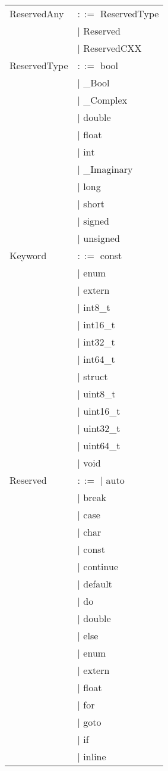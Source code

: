 \documentclass[a4paper]{article}
\begin{document}
\begin{tabular}{ll}
ReservedAny & $::=$ ReservedType\\
	&$\mid$ Reserved\\
	&$\mid$ ReservedCXX\\
ReservedType & $::=$ bool\\
&$\mid$ \_Bool\\
&$\mid$ \_Complex\\
&$\mid$ double\\
&$\mid$ float\\
&$\mid$ int\\
&$\mid$ \_Imaginary\\
&$\mid$ long\\
&$\mid$ short\\
&$\mid$ signed\\
&$\mid$ unsigned\\
Keyword & $::=$ const\\
&$\mid$ enum\\
&$\mid$ extern\\
&$\mid$ int8\_t\\
&$\mid$ int16\_t\\
&$\mid$ int32\_t\\
&$\mid$ int64\_t\\
&$\mid$ struct\\
&$\mid$ uint8\_t\\
&$\mid$ uint16\_t\\
&$\mid$ uint32\_t\\
&$\mid$ uint64\_t\\
&$\mid$ void\\
Reserved & $::=$ $\mid$ auto\\
&$\mid$ break\\
&$\mid$ case\\
&$\mid$ char\\
&$\mid$ const\\
&$\mid$ continue\\
&$\mid$ default\\
&$\mid$ do\\
&$\mid$ double\\
&$\mid$ else\\
&$\mid$ enum\\
&$\mid$ extern\\
&$\mid$ float\\
&$\mid$ for\\
&$\mid$ goto\\
&$\mid$ if\\
&$\mid$ inline\\

\end{tabular}
\end{document}
